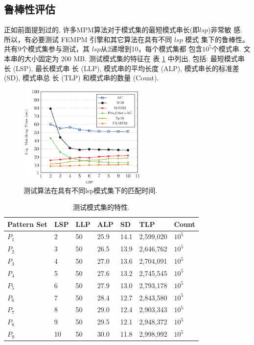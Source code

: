 \subsection{鲁棒性评估}

正如前面提到过的, 许多MPM算法对于模式集的最短模式串长(即$lsp$)非常敏
感. 所以，有必要测试 \textsf{FEMPM} 引擎和其它算法在具有不同 $lsp$ 模式
集下的鲁棒性。 共有9个模式集参与测试，其 $lsp$从2递增到10，每个模式集都
包含$10^5$个模式串. 文本串的大小固定为 200 MB. 测试模式集的特征在
表 \ref{tab:lsps} 中列出, 包括: 最短模式串长 (LSP), 最长模式串
长 (LLP), 模式串的平均长度 (ALP), 模式串长的标准差 (SD), 模式串总
长 (TLP) 和模式串的数量 (Count).

\begin{figure}[!h]
  \centering
  \includegraphics[height=2in, width=2.5in]{figures/2_MPM/lsp}
  \caption{测试算法在具有不同lsp模式集下的匹配时间.}
  \label{fig:lsp}
\end{figure}


\begin{table}
  \centering
  \caption{测试模式集的特性.}
  \scriptsize
  \label{tab:lsps}
  \begin{tabular}{p{20pt}p{10pt}p{10pt}p{10pt}p{10pt}p{30pt}p{20pt}}
    \hline
    Pattern Set & LSP  & LLP  & ALP & SD & TLP & Count\\
    \hline
    $P_1$ & 2 & 50 & 25.9 & 14.1 & 2,599,020 & $10^5$\\
    $P_2$ & 3 & 50 & 26.5 & 13.9 & 2,646,762 & $10^5$\\
    $P_3$ & 4 & 50 & 27.0 & 13.6 & 2,704,091 & $10^5$\\
    $P_4$ & 5 & 50 & 27.6 & 13.2 & 2,745,545 & $10^5$\\
    $P_5$ & 6 & 50 & 27.9 & 13.0 & 2,793,178 & $10^5$\\
    $P_6$ & 7 & 50 & 28.4 & 12.7 & 2,843,580 & $10^5$\\
    $P_7$ & 8 & 50 & 29.0 & 12.4 & 2,903,343 & $10^5$\\
    $P_8$ & 9 & 50 & 29.5 & 12.1 & 2,948,372 & $10^5$\\
    $P_9$ &10 & 50 & 30.0 & 11.8 & 2,998,992 & $10^5$\\
    \hline
  \end{tabular}
\end{table}


